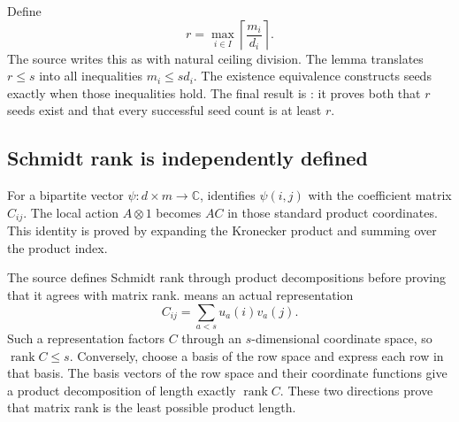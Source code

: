 
Define
\[
r=\max_{i\in I}\left\lceil\frac{m_i}{d_i}\right\rceil.
\]
The source writes this as  with natural ceiling division. The lemma  translates $r\le s$ into all inequalities $m_i\le sd_i$. The existence equivalence constructs seeds exactly when those inequalities hold. The final result is : it proves both that $r$ seeds exist and that every successful seed count is at least $r$.



\subsection{Schmidt rank is independently defined}
For a bipartite vector $\psi:d\times m\to\mathbb C$,  identifies $\psi(i,j)$ with the coefficient matrix $C_{ij}$. The local action $A\otimes 1$ becomes $AC$ in those standard product coordinates. This identity is proved by expanding the Kronecker product and summing over the product index.


The source defines Schmidt rank through product decompositions before proving that it agrees with matrix rank.  means an actual representation
\[
C_{ij}=\sum_{a<s}u_a(i)v_a(j).
\]
Such a representation factors $C$ through an $s$-dimensional coordinate space, so $\operatorname{rank}C\le s$. Conversely, choose a basis of the row space and express each row in that basis. The basis vectors of the row space and their coordinate functions give a product decomposition of length exactly $\operatorname{rank}C$. These two directions prove that matrix rank is the least possible product length.

